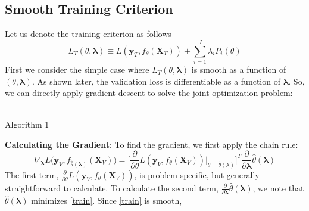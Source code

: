 \documentclass[10pt,letterpaper]{article}
\begin{document}
\subsection{Smooth Training Criterion}
Let us denote the training criterion as follows
\begin{equation}
L_T\left(\theta, \boldsymbol{\lambda}\right) \equiv L(\boldsymbol{y}_T, f_\theta (\boldsymbol{X}_T)) + \sum\limits_{i=1}^J \lambda_i P_i(\theta)
\label{train}
\end{equation}
First we consider the simple case where $L_T\left(\theta, \boldsymbol{\lambda}\right)$ is smooth as a function of $(\theta, \boldsymbol{\lambda})$. As shown later, the validation loss is differentiable as a function of $\boldsymbol{\lambda}$. So, we can directly apply gradient descent to solve the joint optimization problem:
\begin{center}
  \\
  Algorithm 1
\end{center}
\textbf{Calculating the Gradient}:
To find the gradient, we first apply the chain rule:
\begin{equation}
\nabla_{\boldsymbol{\lambda}} L \Big( \boldsymbol{y}_V, f_{\hat{\theta}(\boldsymbol{\lambda})}(\boldsymbol{X}_V) \Big ) = 
\Big [\frac{\partial}{\partial \theta} L ( \boldsymbol{y}_V, f_{\theta}(\boldsymbol{X}_V)) \Big |_{\theta=\hat{\theta}(\lambda)} \Big ]^T 
\frac{\partial}{\partial \boldsymbol{\lambda}} \hat{\theta}(\boldsymbol{\lambda})
\label{chainrule}
\end{equation}
The first term, $\frac{\partial}{\partial \theta} L ( \boldsymbol{y}_V, f_{\theta}(\boldsymbol{X}_V))$, is problem specific, but generally straightforward to calculate. To calculate the second term, $\frac{\partial}{\partial \boldsymbol{\lambda}} \hat{\theta}(\boldsymbol{\lambda})$, we note that $\hat{\theta}(\boldsymbol{\lambda})$ minimizes \eqref{train}. Since \eqref{train} is smooth,
\end{document}
